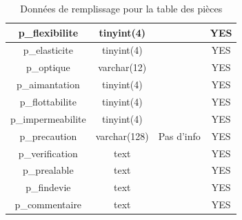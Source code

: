 \documentclass[12pt,a4paper]{article}
\begin{document}
\begin{table}
\begin{center}
\begin{tabular}{|c|c|c|c|}
                p\_flexibilite & tinyint(4) &  & YES \\
                \hline
                p\_elasticite & tinyint(4) &  & YES \\
                \hline
                p\_optique & varchar(12) &  & YES \\
                \hline
                p\_aimantation & tinyint(4) &  & YES \\
                \hline
                p\_flottabilite & tinyint(4) &  & YES \\
                \hline
                p\_impermeabilite & tinyint(4) &  & YES \\
                \hline
                p\_precaution & varchar(128) & Pas d'info & YES \\
                \hline
                p\_verification & text &  & YES \\
                \hline
                p\_prealable & text &  & YES \\
                \hline
                p\_findevie & text &  & YES \\
                \hline
                p\_commentaire & text &  & YES \\
                \hline
            \end{tabular}
        \end{center}
        \caption{Données de remplissage pour la table des pièces}
    \end{table}
\end{document}
